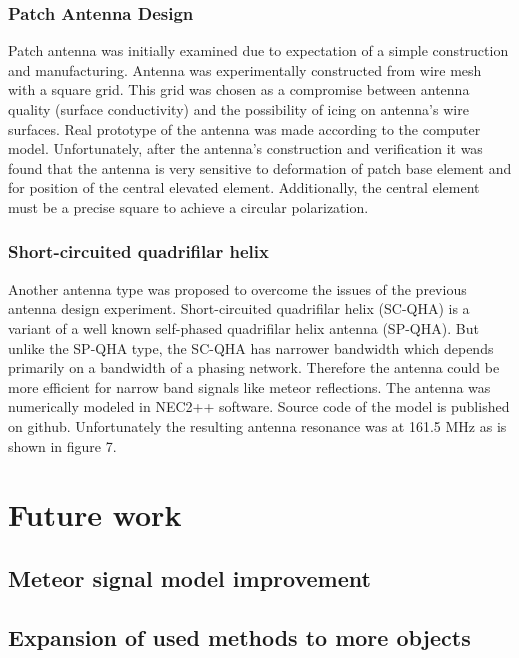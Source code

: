 \documentclass[twoside]{ctuthesis}
\theoremstyle{plain}
\theoremstyle{definition}
\theoremstyle{note}
\begin{document}
\subsection{Patch Antenna Design }

Patch antenna was initially examined due to expectation of a simple construction and manufacturing. Antenna was experimentally constructed from wire mesh with  a square grid. This grid was chosen as a compromise between antenna quality (surface conductivity)  and the possibility of icing on antenna’s wire  surfaces. Real prototype of the antenna was made according to the computer model. Unfortunately, after the antenna’s construction and verification it was found that the antenna is very sensitive to deformation of patch base element and for position of the central elevated element. Additionally, the central element must be a precise square to achieve a circular polarization. 

\subsection{Short-circuited quadrifilar helix}

Another antenna type was proposed to overcome the issues of the previous antenna design experiment.  Short-circuited quadrifilar helix (SC-QHA) is a variant of a well known self-phased quadrifilar helix  antenna (SP-QHA). But unlike the SP-QHA type, the  SC-QHA has narrower bandwidth which depends primarily on a bandwidth of a phasing network. Therefore the antenna could be more efficient for narrow band signals like meteor reflections.  The antenna was numerically modeled in NEC2++ software. Source code of  the model is published on github.
Unfortunately the resulting antenna resonance was at 161.5 MHz as is shown in figure 7.

\chapter{Future work}

\section{Meteor signal model improvement}

\section{Expansion of used methods to more objects}
\end{document}
